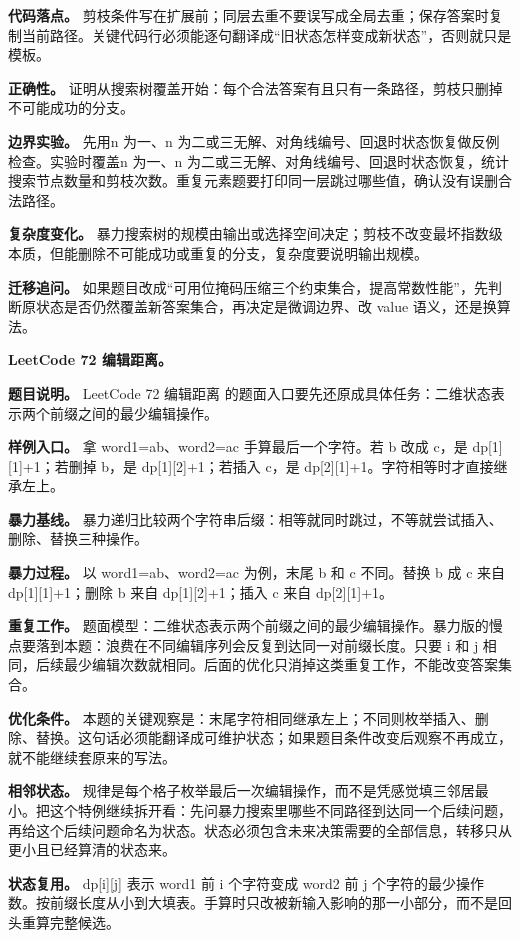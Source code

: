 \textbf{代码落点。} 剪枝条件写在扩展前；同层去重不要误写成全局去重；保存答案时复制当前路径。关键代码行必须能逐句翻译成“旧状态怎样变成新状态”，否则就只是模板。

\textbf{正确性。} 证明从搜索树覆盖开始：每个合法答案有且只有一条路径，剪枝只删掉不可能成功的分支。

\textbf{边界实验。} 先用n 为一、n 为二或三无解、对角线编号、回退时状态恢复做反例检查。实验时覆盖n 为一、n 为二或三无解、对角线编号、回退时状态恢复，统计搜索节点数量和剪枝次数。重复元素题要打印同一层跳过哪些值，确认没有误删合法路径。

\textbf{复杂度变化。} 暴力搜索树的规模由输出或选择空间决定；剪枝不改变最坏指数级本质，但能删除不可能成功或重复的分支，复杂度要说明输出规模。

\textbf{迁移追问。} 如果题目改成“可用位掩码压缩三个约束集合，提高常数性能”，先判断原状态是否仍然覆盖新答案集合，再决定是微调边界、改 value 语义，还是换算法。

\noindent\textbf{LeetCode 72 编辑距离。}

\textbf{题目说明。} LeetCode 72 编辑距离 的题面入口要先还原成具体任务：二维状态表示两个前缀之间的最少编辑操作。

\textbf{样例入口。} 拿 word1=ab、word2=ac 手算最后一个字符。若 b 改成 c，是 dp[1][1]+1；若删掉 b，是 dp[1][2]+1；若插入 c，是 dp[2][1]+1。字符相等时才直接继承左上。

\textbf{暴力基线。} 暴力递归比较两个字符串后缀：相等就同时跳过，不等就尝试插入、删除、替换三种操作。

\textbf{暴力过程。} 以 word1=ab、word2=ac 为例，末尾 b 和 c 不同。替换 b 成 c 来自 dp[1][1]+1；删除 b 来自 dp[1][2]+1；插入 c 来自 dp[2][1]+1。

\textbf{重复工作。} 题面模型：二维状态表示两个前缀之间的最少编辑操作。暴力版的慢点要落到本题：浪费在不同编辑序列会反复到达同一对前缀长度。只要 i 和 j 相同，后续最少编辑次数就相同。后面的优化只消掉这类重复工作，不能改变答案集合。

\textbf{优化条件。} 本题的关键观察是：末尾字符相同继承左上；不同则枚举插入、删除、替换。这句话必须能翻译成可维护状态；如果题目条件改变后观察不再成立，就不能继续套原来的写法。

\textbf{相邻状态。} 规律是每个格子枚举最后一次编辑操作，而不是凭感觉填三邻居最小。把这个特例继续拆开看：先问暴力搜索里哪些不同路径到达同一个后续问题，再给这个后续问题命名为状态。状态必须包含未来决策需要的全部信息，转移只从更小且已经算清的状态来。

\textbf{状态复用。} dp[i][j] 表示 word1 前 i 个字符变成 word2 前 j 个字符的最少操作数。按前缀长度从小到大填表。手算时只改被新输入影响的那一小部分，而不是回头重算完整候选。

